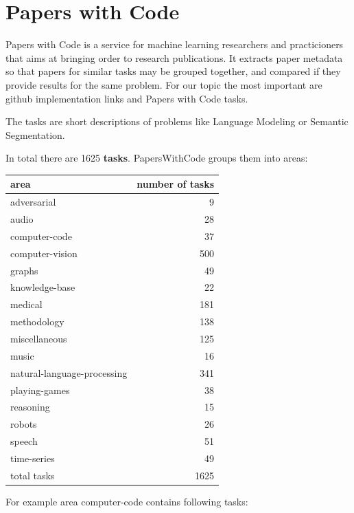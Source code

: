 \documentclass[11pt]{report}
\begin{document}
\section{Papers with Code}

Papers with Code is a service for machine learning researchers and practicioners that aims at bringing order to research publications. It extracts paper metadata so that papers for similar tasks may be grouped together, and compared if they provide results for the same problem. For our topic the most important are github implementation links and Papers with Code tasks.

The tasks are short descriptions of problems like Language Modeling or Semantic Segmentation.

In total there are 1625 \textbf{tasks}. PapersWithCode groups them into areas:

\begin{center}
\begin{tabular}{|l|r|}
\hline
area & number of tasks\\
\hline
adversarial & 9\\
audio & 28\\
computer-code & 37\\
computer-vision & 500\\
graphs & 49\\
knowledge-base & 22\\
medical & 181\\
methodology & 138\\
miscellaneous & 125\\
music & 16\\
natural-language-processing & 341\\
playing-games & 38\\
reasoning & 15\\
robots & 26\\
speech & 51\\
time-series & 49\\
\hline
total tasks & 1625\\
\hline
\end{tabular}
\end{center}

For example area computer-code contains following tasks:
\end{document}
